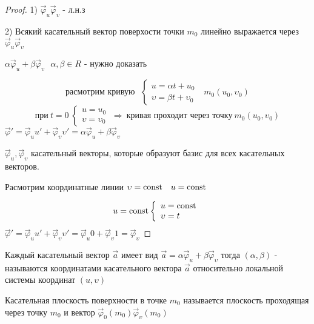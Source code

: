 \begin{proof}
  1) $\vec \varphi_u \vec \varphi_{\upsilon}$ - л.н.з

  2) Всякий касательный вектор поверхости точки $m_0$ линейно выражается через
  $\vec \varphi_u \vec \varphi_{\upsilon}$

  $\alpha \vec \varphi_u +\beta \vec \varphi_{\upsilon} ~~~
  \alpha, \beta \in R$ - нужно доказать

  $$
  \text{расмотрим кривую} ~~~
  \left\{
    \begin{array}{l}
      u = \alpha t + u_0 \\
      \upsilon = \beta t + \upsilon_0
    \end{array}
  \right. ~~~ m_0 (u_0, \upsilon_0)
  $$
  $$
  \text{при} ~ t = 0 ~
  \left\{
    \begin{array}{l}
      u = u_0 \\
      \upsilon = \upsilon_0
    \end{array}
  \right. ~ \Rightarrow ~ \text{кривая проходит через точку} ~
  m_0 (u_0, \upsilon_0)
  $$
  $\vec \varphi' = \vec \varphi_u u' + \vec \varphi_{\upsilon}
  \upsilon' = \alpha \vec \varphi_u + \beta \vec \varphi_{\upsilon}$

  $\vec \varphi_u, \vec \varphi_{\upsilon}$ касательный векторы, которые
  образуют базис для всех касательных векторов.

  Расмотрим координатные линии $\upsilon = \mathrm{const} ~~~ u = \mathrm{const}$

  $$
  u = \mathrm{const}
  \left\{
    \begin{array}{l}
      u = \mathrm{const} \\
      \upsilon = t
    \end{array}
  \right.
  $$
  $\vec \varphi' = \vec \varphi_u u' + \vec \varphi_{\upsilon}
  \upsilon' = \vec \varphi_u 0 + \vec \varphi_{\upsilon} 1 =
  \vec \varphi_{\upsilon}$
\end{proof}

\begin{define}
  Каждый касательный вектор $\vec a$ имеет вид $\vec a =
  \alpha \vec \varphi_u + \beta \vec \varphi_{\upsilon}$ тогда
  $(\alpha, \beta)$ - называются
  координатами касательного вектора $\vec a$ относительно локальной системы
  координат $(u, \upsilon)$
\end{define}

\begin{define}
  Касательная плоскость поверхности в точке $m_0$ называется плоскость
  проходящая через точку $m_0$ и вектор $\vec \varphi_0 (m_0)
  \vec \varphi_{\upsilon}(m_0)$
\end{define}
